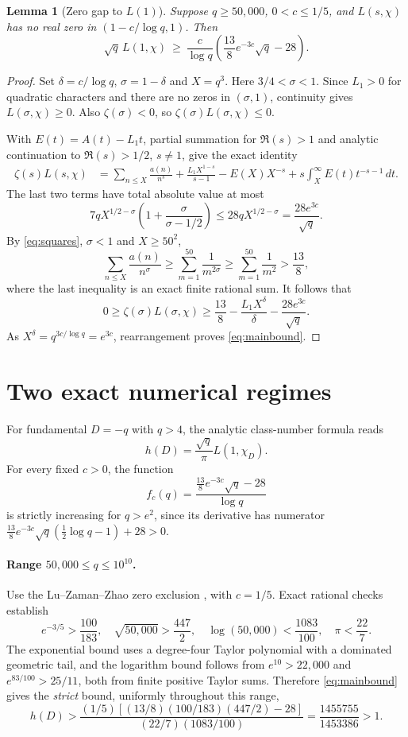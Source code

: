 \documentclass[10pt,a4paper]{article}
\newtheorem{lemma}{Lemma}
\begin{document}
\begin{lemma}[Zero gap to $L(1)$]\label{lem:bridge}
Suppose $q\ge50{,}000$, $0<c\le1/5$, and $L(s,\chi)$ has no
real zero in $(1-c/\log q,1)$. Then
\begin{equation}\label{eq:mainbound}
  \boxed{\quad \sqrt q\,L(1,\chi)\ \ge\
  \frac{c}{\log q}\left(\frac{13}{8}e^{-3c}\sqrt q-28\right).\quad}
\end{equation}
\end{lemma}
\begin{proof}
Set $\delta=c/\log q$, $\sigma=1-\delta$ and $X=q^3$.
Here $3/4<\sigma<1$. Since $L_1>0$ for quadratic characters and
there are no zeros in $(\sigma,1)$, continuity gives $L(\sigma,\chi)\ge0$.
Also $\zeta(\sigma)<0$, so $\zeta(\sigma)L(\sigma,\chi)\le0$.

With $E(t)=A(t)-L_1t$, partial summation for $\Re(s)>1$ and analytic
continuation to $\Re(s)>1/2$, $s\ne1$, give the exact identity
\begin{align*}
\zeta(s)L(s,\chi)
&=\sum_{n\le X}\frac{a(n)}{n^s}
  +\frac{L_1 X^{1-s}}{s-1}
  -E(X)X^{-s}+s\int_X^\infty E(t)t^{-s-1}\,dt.
\end{align*}
The last two terms have total absolute value at most
\[
 7qX^{1/2-\sigma}\left(1+\frac{\sigma}{\sigma-1/2}\right)
 \le28qX^{1/2-\sigma}=\frac{28e^{3c}}{\sqrt q}.
\]
By \eqref{eq:squares}, $\sigma<1$ and $X\ge50^2$,
\[
 \sum_{n\le X}\frac{a(n)}{n^\sigma}
 \ge\sum_{m=1}^{50}\frac1{m^{2\sigma}}
 \ge\sum_{m=1}^{50}\frac1{m^2}>\frac{13}{8},
\]
where the last inequality is an exact finite rational sum.
It follows that
\[
 0\ge\zeta(\sigma)L(\sigma,\chi)
 \ge\frac{13}{8}-\frac{L_1 X^\delta}{\delta}
       -\frac{28e^{3c}}{\sqrt q}.
\]
As $X^\delta=q^{3c/\log q}=e^{3c}$, rearrangement proves
\eqref{eq:mainbound}.
\end{proof}

\section{Two exact numerical regimes}
For fundamental $D=-q$ with $q>4$, the analytic class-number formula reads
\[
 h(D)=\frac{\sqrt q}{\pi}L(1,\chi_D).
\]
For every fixed $c>0$, the function
\[
 f_c(q)=\frac{\frac{13}{8}e^{-3c}\sqrt q-28}{\log q}
\]
is strictly increasing for $q>e^2$, since its derivative has numerator
$\frac{13}{8}e^{-3c}\sqrt q(\frac12\log q-1)+28>0$.

\paragraph{Range $50{,}000\le q\le10^{10}$.}
Use the Lu--Zaman--Zhao zero exclusion \cite[Theorem~1.1]{lzz}, with $c=1/5$.
Exact rational checks establish
\[
 e^{-3/5}>\frac{100}{183},\quad
 \sqrt{50{,}000}>\frac{447}{2},\quad
 \log(50{,}000)<\frac{1083}{100},\quad \pi<\frac{22}{7}.
\]
The exponential bound uses a degree-four Taylor polynomial with a
dominated geometric tail, and the logarithm bound follows from
$e^{10}>22{,}000$ and $e^{83/100}>25/11$, both from finite positive
Taylor sums. Therefore \eqref{eq:mainbound} gives the \emph{strict}
bound, uniformly throughout this range,
\[
 h(D)>\frac{(1/5)\left[(13/8)(100/183)(447/2)-28\right]}
                  {(22/7)(1083/100)}
      =\frac{1455755}{1453386}>1.
\]
\end{document}
